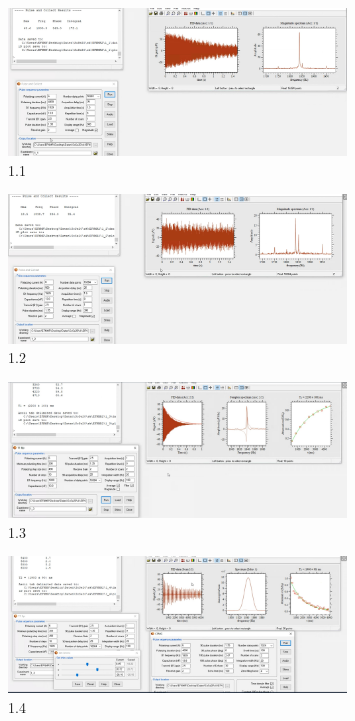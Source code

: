     \begin{figure}[H]
        \centering
        \includegraphics[width = 0.8\textwidth]{Screenshot2/1_1.jpg}
        \caption{1.1}
    \end{figure}
    \begin{figure}[H]
        \centering
        \includegraphics[width = 0.8\textwidth]{Screenshot2/1_2.jpg}
        \caption{1.2}
    \end{figure}
    \begin{figure}[H]
        \centering
        \includegraphics[width = 0.8\textwidth]{Screenshot2/1_3.jpg}
        \caption{1.3}
    \end{figure}
    \begin{figure}[H]
        \centering
        \includegraphics[width = 0.8\textwidth]{Screenshot2/1_4.jpg}
        \caption{1.4}
    \end{figure}
